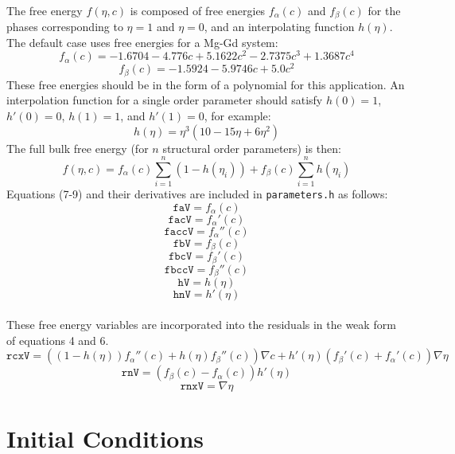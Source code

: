 \documentclass[11pt]{article}
\begin{document}
\paragraph{}
The free energy $f(\eta,c)$ is composed of free energies $f_\alpha(c)$ and $f_\beta(c)$ for the phases corresponding to $\eta=1$ and $\eta=0$, and an interpolating function $h(\eta)$.  The default case uses free energies for a Mg-Gd system:
\begin{equation}
f_\alpha(c)=-1.6704 -4.776 c+5.1622 c^2 -2.7375 c^3 +1.3687 c^4
\end{equation}
\begin{equation}
f_\beta(c)=-1.5924 -5.9746 c+5.0 c^2
\end{equation}
These free energies should be in the form of a polynomial for this application.  An interpolation function for a single order parameter should satisfy $h(0)=1$, $h'(0)=0$, $h(1)=1$, and $h'(1)=0$, for example:
\begin{equation}
h(\eta)= \eta^3 (10 - 15 \eta + 6 \eta^2)
\end{equation}
The full bulk free energy (for $n$ structural order parameters) is then:
\begin{equation}
f(\eta, c)= f_\alpha(c) \sum_{i=1}^n (1-h(\eta_i)) + f_\beta(c) \sum_{i=1}^n h(\eta_i)
\end{equation}
Equations (7-9) and their derivatives are included in \texttt{parameters.h} as follows:
\[ \texttt{faV} = f_\alpha(c) \]
\[ \texttt{facV}  = f_\alpha'(c) \]
\[ \texttt{faccV} = f_\alpha''(c) \]
\[ \texttt{fbV} = f_\beta(c) \]
\[ \texttt{fbcV} = f_\beta'(c) \]
\[ \texttt{fbccV}  = f_\beta''(c) \]
\[ \texttt{hV} = h(\eta) \]
\[ \texttt{hnV} = h'(\eta) \]
\paragraph{}
These free energy variables are incorporated into the residuals in the weak form of equations 4 and 6.
\[ \texttt{rcxV} = \left( (1-h(\eta)) f_\alpha''(c) + h(\eta) f_\beta''(c) \right) \nabla c + h'(\eta)(f_\beta'(c)+f_\alpha'(c)) \nabla \eta \]
\[ \texttt{rnV} =( f_\beta(c)-f_\alpha(c)) h'(\eta) \]
\[ \texttt{rnxV} = \nabla \eta \]


\section{Initial Conditions}
\end{document}
